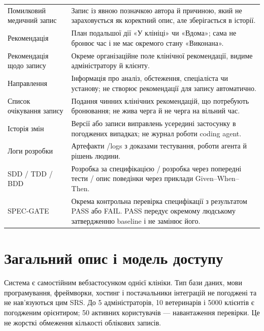 \documentclass[11pt,a4paper]{article}
\begin{document}
\begin{longtable}{>{\raggedright\arraybackslash}p{4.3cm} >{\raggedright\arraybackslash}p{11.3cm}}
Помилковий медичний запис & Запис із явною позначкою автора й причиною, який не зараховується як коректний опис, але зберігається в історії. \\
Рекомендація & План подальшої дії «У клініці» чи «Вдома»; сама не бронює час і не має окремого стану «Виконана». \\
Рекомендація щодо запису & Окреме організаційне поле клінічної рекомендації, видиме адміністратору й клієнту. \\
Направлення & Інформація про аналіз, обстеження, спеціаліста чи установу; не створює рекомендації для запису автоматично. \\
Список очікування запису & Подання чинних клінічних рекомендацій, що потребують бронювання; не жива черга й не черга на вільний час. \\
Історія змін & Версії або записи виправлень усередині застосунку в погоджених випадках; не журнал роботи coding agent. \\
Логи розробки & Артефакти /logs з доказами тестування, роботи агента й рішень людини. \\
SDD / TDD / BDD & Розробка за специфікацією / розробка через попередні тести / опис поведінки через приклади Given–When–Then. \\
SPEC-GATE & Окрема контрольна перевірка специфікації з результатом PASS або FAIL. PASS передує окремому людському затвердженню baseline і не замінює його. \\
\end{longtable}

\section{Загальний опис і модель доступу}
Система є самостійним вебзастосунком однієї клініки. Тип бази даних, мови програмування, фреймворки, хостинг і постачальники інтеграцій не погоджені та не нав’язуються цим SRS. До 5 адміністраторів, 10 ветеринарів і 5000 клієнтів є погодженим орієнтиром; 50 активних користувачів — навантаження перевірки. Це не жорсткі обмеження кількості облікових записів.
\end{document}
